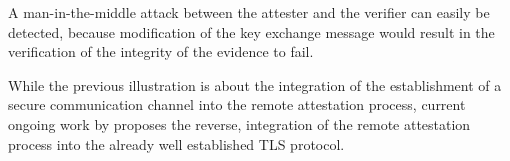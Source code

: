 A man-in-the-middle attack between the attester and the verifier can easily be
detected, because modification of the key exchange message would result in the
verification of the integrity of the evidence to fail.

While the previous illustration is about the integration of the establishment of
a secure communication channel into the remote attestation process, current
ongoing work by \citeauthor{fossati-tls-attestation-02}
\cite{fossati-tls-attestation-02} proposes the reverse, integration of the
remote attestation process into the already well established TLS protocol.
